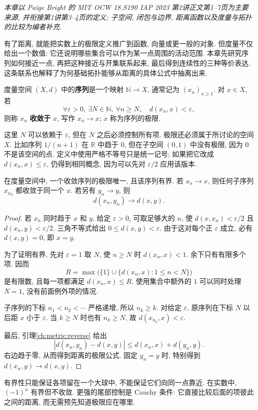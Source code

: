\label{ch:seq}
\emph{本章以 Paige Bright 的 MIT OCW 18.S190 IAP 2023 第2讲正文第1--7页为主要来源, 并衔接第1讲第3--4页的定义; 子空间, 闭包与边界, 距离函数以及度量与拓扑的比较为编者补充.}

有了距离, 就能把实数上的极限定义推广到函数, 向量或更一般的对象. 但度量不仅给出一个数值: 它还说明哪些集合可以作为某一点周围的活动范围. 本章先研究序列如何接近一点, 再把这种接近与开集联系起来, 最后得到连续性的三种等价表达. 这条联系也解释了为何基础拓扑能够从距离的具体公式中抽离出来.

\label{ch:seq:convergence}
\begin{definition}[序列收敛]\label{ch:seq:def-convergence}
度量空间 $(X,d)$ 中的\textbf{序列}是一个映射 $\mathbb{N}\to X$, 通常记为 $(x_n)_{n\ge1}$. 对 $x\in X$, 若
\[
 \forall\varepsilon>0,\ \exists N\in\mathbb{N},\
 \forall n\ge N,\quad d(x_n,x)<\varepsilon,
\]
则称 $x_n$ \textbf{收敛于} $x$, 写作 $x_n\to x$; $x$ 称为序列的极限.
\end{definition}
这里 $N$ 可以依赖于 $\varepsilon$, 但在 $N$ 之后必须控制所有项. 极限还必须属于所讨论的空间 $X$. 比如序列 $1/(n+1)$ 在 $\mathbb{R}$ 中趋于 $0$, 但在子空间 $(0,1)$ 中没有极限, 因为 $0$ 不是该空间的点. 定义中使用严格不等号只是统一记号; 如果把它改成 $d(x_n,x)\le\varepsilon$, 仍得到相同概念, 因为可以先对 $\varepsilon/2$ 应用该版本.

\begin{theorem}[极限的基本性质]\label{ch:seq:basic-limits}
在度量空间中, 一个收敛序列的极限唯一, 且该序列有界. 若 $x_n\to x$, 则任何子序列 $x_{n_k}$ 都收敛于同一个 $x$. 若另有 $y_n\to y$, 则
\[
 d(x_n,y_n)\longrightarrow d(x,y).
\]
\end{theorem}
\begin{proof}
若 $x_n$ 同时趋于 $x$ 和 $y$, 给定 $\varepsilon>0$, 可取足够大的 $n$, 使 $d(x,x_n)<\varepsilon/2$ 且 $d(x_n,y)<\varepsilon/2$. 三角不等式给出 $0\le d(x,y)<\varepsilon$. 由于这对每个正 $\varepsilon$ 成立, 必有 $d(x,y)=0$, 即 $x=y$.

为了证明有界, 先对 $\varepsilon=1$ 取 $N$, 使 $n\ge N$ 时 $d(x_n,x)<1$. 余下只有有限多个项. 因而
\[
 R=\max\bigl(\{1\}\cup\{d(x_n,x):1\le n<N\}\bigr)
\]
是有限数, 且每一项都满足 $d(x_n,x)\le R$. 使用集合中额外的 $1$ 可以同时处理 $N=1$, 没有前面例外项的情况.

子序列的下标 $n_1<n_2<\cdots$ 严格递增, 所以 $n_k\ge k$. 对给定 $\varepsilon$, 原序列在下标 $N$ 以后距 $x$ 小于 $\varepsilon$. 当 $k\ge N$ 时也有 $n_k\ge N$, 故 $d(x_{n_k},x)<\varepsilon$.

最后, 引理\ref{ch:metric:reverse} 给出
\[
 |d(x_n,y_n)-d(x,y)|\le d(x_n,x)+d(y_n,y).
\]
右边趋于零, 从而得到距离的极限公式. 固定 $y_n=y$ 时, 特别得到 $d(x_n,y)\to d(x,y)$.
\end{proof}
有界性只能保证各项留在一个大球中, 不能保证它们向同一点靠近. 在实数中, $(-1)^n$ 有界但不收敛. 更强的尾部控制是 Cauchy 条件: 它直接比较后面的项彼此之间的距离, 而无需预先知道极限应在哪里.

